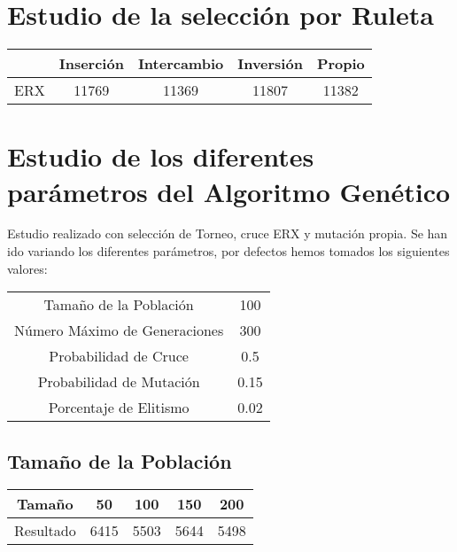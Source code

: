 \documentclass[12pt]{article}
\begin{document}
\section{Estudio de la selección por Ruleta}	

\begin{table}[H]
\begin{center}
\begin{tabular}{|ccccc|} \hline
	   & Inserción & Intercambio & Inversión & Propio \\  \hline
ERX    & 11769 & 11369 & 11807 & 11382 \\  \hline
\end{tabular}
\end{center}
\end{table}

\section{Estudio de los diferentes parámetros del Algoritmo Genético}

	Estudio realizado con selección de Torneo, cruce ERX y mutación propia. Se han ido variando los diferentes parámetros, por defectos hemos tomados los siguientes valores:

\begin{table}[H]
\begin{center}
\begin{tabular}{|cc|} \hline
Tamaño de la Población   & 100  \\  
Número Máximo de Generaciones  &  300 \\
Probabilidad de Cruce & 0.5 \\
Probabilidad de Mutación & 0.15 \\
Porcentaje de Elitismo & 0.02 \\ \hline
\end{tabular}
\end{center}
\end{table}

\subsection{Tamaño de la Población}
\begin{table}[H]
\begin{center}
\begin{tabular}{|ccccc|} \hline
Tamaño	   & 50 & 100 & 150 & 200 \\  \hline
Resultado  &  6415 & 5503 & 5644 & 5498 \\ \hline
\end{tabular}
\end{center}
\end{table}
\end{document}
